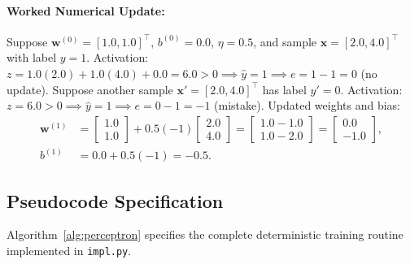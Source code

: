 \documentclass[11pt]{article}
\begin{document}
\paragraph{Worked Numerical Update:}
Suppose $\mathbf{w}^{(0)} = [1.0, 1.0]^\top$, $b^{(0)} = 0.0$, $\eta = 0.5$, and sample $\mathbf{x} = [2.0, 4.0]^\top$ with label $y = 1$.
Activation: $z = 1.0(2.0) + 1.0(4.0) + 0.0 = 6.0 > 0 \implies \hat{y} = 1 \implies e = 1 - 1 = 0$ (no update).
Suppose another sample $\mathbf{x}' = [2.0, 4.0]^\top$ has label $y' = 0$.
Activation: $z = 6.0 > 0 \implies \hat{y} = 1 \implies e = 0 - 1 = -1$ (mistake).
Updated weights and bias:
\begin{align}
\mathbf{w}^{(1)} &= \begin{bmatrix} 1.0 \\ 1.0 \end{bmatrix} + 0.5(-1)\begin{bmatrix} 2.0 \\ 4.0 \end{bmatrix} = \begin{bmatrix} 1.0 - 1.0 \\ 1.0 - 2.0 \end{bmatrix} = \begin{bmatrix} 0.0 \\ -1.0 \end{bmatrix}, \\
b^{(1)} &= 0.0 + 0.5(-1) = -0.5.
\end{align}

\subsection{Pseudocode Specification}
Algorithm~\ref{alg:perceptron} specifies the complete deterministic training routine implemented in \texttt{impl.py}.
\end{document}
